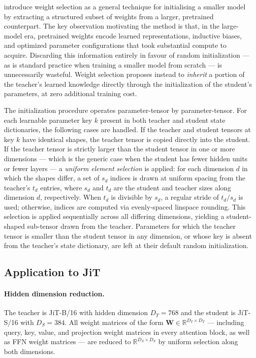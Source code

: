 \cite{xu2024initializing} introduce weight selection as a general technique for initialising a smaller model by extracting a structured subset of weights from a larger, pretrained counterpart. The key observation motivating the method is that, in the large-model era, pretrained weights encode learned representations, inductive biases, and optimized parameter configurations that took substantial compute to acquire. Discarding this information entirely in favour of random initialization — as is standard practice when training a smaller model from scratch — is unnecessarily wasteful. Weight selection proposes instead to \emph{inherit} a portion of the teacher's learned knowledge directly through the initialization of the student's parameters, at zero additional training cost.

The initialization procedure operates parameter-tensor by parameter-tensor. For each learnable parameter key $k$ present in both teacher and student state dictionaries, the following cases are handled. If the teacher and student tensors at key $k$ have identical shapes, the teacher tensor is copied directly into the student. If the teacher tensor is strictly larger than the student tensor in one or more dimensions — which is the generic case when the student has fewer hidden units or fewer layers — a \emph{uniform element selection} is applied: for each dimension $d$ in which the shapes differ, a set of $s_d$ indices is drawn at uniform spacing from the teacher's $t_d$ entries, where $s_d$ and $t_d$ are the student and teacher sizes along dimension $d$, respectively. When $t_d$ is divisible by $s_d$, a regular stride of $t_d / s_d$ is used; otherwise, indices are computed via evenly-spaced linspace rounding. This selection is applied sequentially across all differing dimensions, yielding a student-shaped sub-tensor drawn from the teacher. Parameters for which the teacher tensor is smaller than the student tensor in any dimension, or whose key is absent from the teacher's state dictionary, are left at their default random initialization.

\subsection*{Application to JiT}

\paragraph{Hidden dimension reduction.} The teacher is JiT-B/16 with hidden dimension $D_T = 768$ and the student is JiT-S/16 with $D_S = 384$. All weight matrices of the form $\mathbf{W} \in \mathbb{R}^{D_T \times D_T}$ — including query, key, value, and projection weight matrices in every attention block, as well as FFN weight matrices — are reduced to $\mathbb{R}^{D_S \times D_S}$ by uniform selection along both dimensions.


